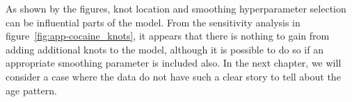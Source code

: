 As shown by the figures, knot location and smoothing
hyperparameter selection can be influential parts of the model.
From the sensitivity analysis in figure~\ref{fig:app-cocaine_knots},
it appears that there is nothing to gain from adding additional
knots to the model, although it is possible to do so if an appropriate
smoothing parameter is included also.  In the next chapter, we will
consider a case where the data do not have such a clear story to
tell about the age pattern.
